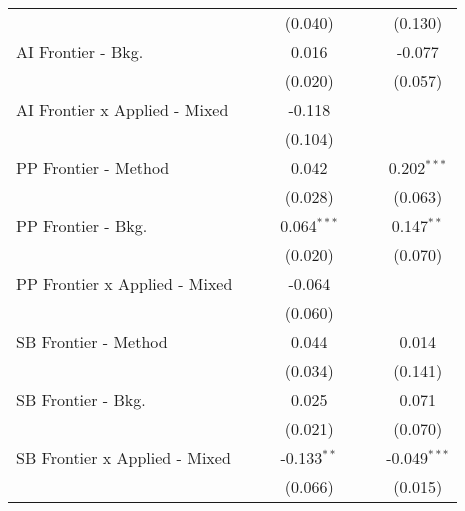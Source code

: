 \begin{tabular}{lcccccc}
                                 &               &               & (0.040)       &               &         & (0.130)\\   
   AI Frontier - Bkg.            &               &               & 0.016         &               &         & -0.077\\   
                                 &               &               & (0.020)       &               &         & (0.057)\\   
   AI Frontier x Applied - Mixed &               &               & -0.118        &               &         &   \\   
                                 &               &               & (0.104)       &               &         &   \\   
   PP Frontier - Method          &               &               & 0.042         &               &         & 0.202$^{***}$\\   
                                 &               &               & (0.028)       &               &         & (0.063)\\   
   PP Frontier - Bkg.            &               &               & 0.064$^{***}$ &               &         & 0.147$^{**}$\\   
                                 &               &               & (0.020)       &               &         & (0.070)\\   
   PP Frontier x Applied - Mixed &               &               & -0.064        &               &         &   \\   
                                 &               &               & (0.060)       &               &         &   \\   
   SB Frontier - Method          &               &               & 0.044         &               &         & 0.014\\   
                                 &               &               & (0.034)       &               &         & (0.141)\\   
   SB Frontier - Bkg.            &               &               & 0.025         &               &         & 0.071\\   
                                 &               &               & (0.021)       &               &         & (0.070)\\   
   SB Frontier x Applied - Mixed &               &               & -0.133$^{**}$ &               &         & -0.049$^{***}$\\   
                                 &               &               & (0.066)       &               &         & (0.015)\\   

\end{tabular}
